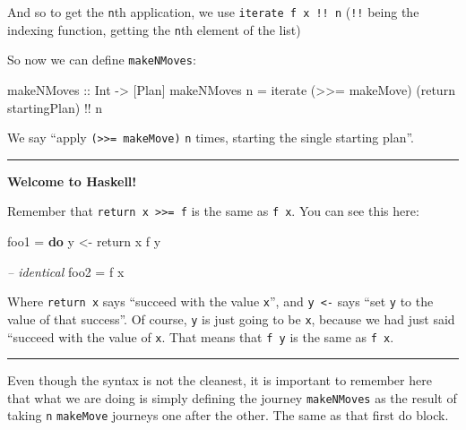 \documentclass[]{article}
\newenvironment{Shaded}{}{}
\newcommand{\KeywordTok}[1]{\textcolor[rgb]{0.00,0.44,0.13}{\textbf{{#1}}}}
\newcommand{\DataTypeTok}[1]{\textcolor[rgb]{0.56,0.13,0.00}{{#1}}}
\newcommand{\CommentTok}[1]{\textcolor[rgb]{0.38,0.63,0.69}{\textit{{#1}}}}
\newcommand{\OtherTok}[1]{\textcolor[rgb]{0.00,0.44,0.13}{{#1}}}
\newcommand{\FunctionTok}[1]{\textcolor[rgb]{0.02,0.16,0.49}{{#1}}}
\newcommand{\NormalTok}[1]{{#1}}
\begin{document}
And so to get the \texttt{n}th application, we use \texttt{iterate\ f\ x\ !!\ n}
(\texttt{!!} being the indexing function, getting the \texttt{n}th element of
the list)

So now we can define \texttt{makeNMoves}:

\begin{Shaded}
\begin{Highlighting}[]
\OtherTok{makeNMoves ::} \DataTypeTok{Int} \OtherTok{->} \NormalTok{[}\DataTypeTok{Plan}\NormalTok{]}
\NormalTok{makeNMoves n }\FunctionTok{=} \NormalTok{iterate (}\FunctionTok{>>=} \NormalTok{makeMove) (return startingPlan) }\FunctionTok{!!} \NormalTok{n}
\end{Highlighting}
\end{Shaded}

We say ``apply \texttt{(\textgreater{}\textgreater{}=\ makeMove)} \texttt{n}
times, starting the single starting plan''.

\begin{center}\rule{0.5\linewidth}{\linethickness}\end{center}

\textbf{Welcome to Haskell!}

Remember that \texttt{return\ x\ \textgreater{}\textgreater{}=\ f} is the same
as \texttt{f\ x}. You can see this here:

\begin{Shaded}
\begin{Highlighting}[]
\NormalTok{foo1 }\FunctionTok{=} \KeywordTok{do}
    \NormalTok{y }\OtherTok{<-} \NormalTok{return x}
    \NormalTok{f y}

\CommentTok{-- identical}
\NormalTok{foo2 }\FunctionTok{=} \NormalTok{f x}
\end{Highlighting}
\end{Shaded}

Where \texttt{return\ x} says ``succeed with the value \texttt{x}'', and
\texttt{y\ \textless{}-} says ``set \texttt{y} to the value of that success''.
Of course, \texttt{y} is just going to be \texttt{x}, because we had just said
``succeed with the value of \texttt{x}. That means that \texttt{f\ y} is the
same as \texttt{f\ x}.

\begin{center}\rule{0.5\linewidth}{\linethickness}\end{center}

Even though the syntax is not the cleanest, it is important to remember here
that what we are doing is simply defining the journey \texttt{makeNMoves} as the
result of taking \texttt{n} \texttt{makeMove} journeys one after the other. The
same as that first do block.
\end{document}
